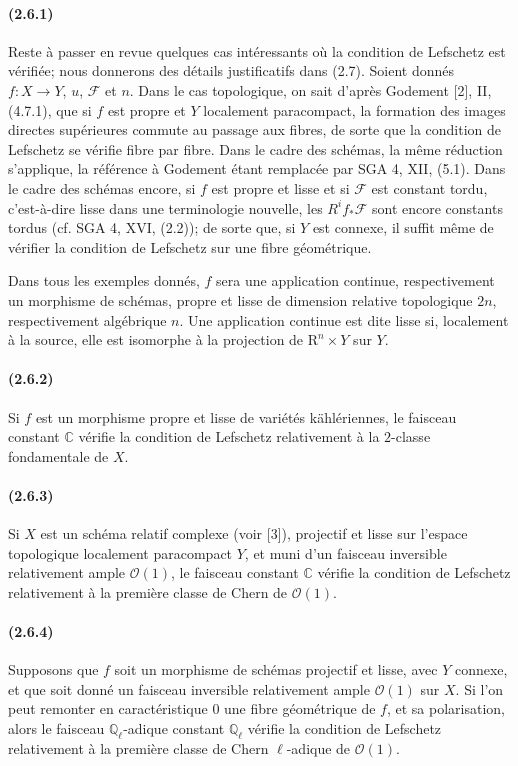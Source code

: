 \documentclass[10pt]{article}
\newcommand{\R}{\mathrm R}
\providecommand{\C}{\mathbb C}
\providecommand{\Ql}{\mathbb Q_\ell}
\begin{document}
\paragraph{(2.6.1)} Reste à passer en revue quelques cas intéressants où la condition de Lefschetz est vérifiée; nous donnerons des détails justificatifs dans (2.7). Soient donnés $f:X\to Y$, $u$, $\mathcal F$ et $n$. Dans le cas topologique, on sait d'après Godement [2], II, (4.7.1), que si $f$ est propre et $Y$ localement paracompact, la formation des images directes supérieures commute au passage aux fibres, de sorte que la condition de Lefschetz se vérifie fibre par fibre. Dans le cadre des schémas, la même réduction s'applique, la référence à Godement étant remplacée par SGA 4, XII, (5.1). Dans le cadre des schémas encore, si $f$ est propre et lisse et si $\mathcal F$ est constant tordu, c'est-à-dire lisse dans une terminologie nouvelle, les $R^if_*\mathcal F$ sont encore constants tordus (cf. SGA 4, XVI, (2.2)); de sorte que, si $Y$ est connexe, il suffit même de vérifier la condition de Lefschetz sur une fibre géométrique.

Dans tous les exemples donnés, $f$ sera une application continue, respectivement un morphisme de schémas, propre et lisse de dimension relative topologique $2n$, respectivement algébrique $n$. Une application continue est dite lisse si, localement à la source, elle est isomorphe à la projection de $\R^n\times Y$ sur $Y$.

\paragraph{(2.6.2)} Si $f$ est un morphisme propre et lisse de variétés kählériennes, le faisceau constant $\C$ vérifie la condition de Lefschetz relativement à la $2$-classe fondamentale de $X$.

\paragraph{(2.6.3)} Si $X$ est un schéma relatif complexe (voir [3]), projectif et lisse sur l'espace topologique localement paracompact $Y$, et muni d'un faisceau inversible relativement ample $\mathcal O(1)$, le faisceau constant $\C$ vérifie la condition de Lefschetz relativement à la première classe de Chern de $\mathcal O(1)$.

\paragraph{(2.6.4)} Supposons que $f$ soit un morphisme de schémas projectif et lisse, avec $Y$ connexe, et que soit donné un faisceau inversible relativement ample $\mathcal O(1)$ sur $X$. Si l'on peut remonter en caractéristique $0$ une fibre géométrique de $f$, et sa polarisation, alors le faisceau $\Ql$-adique constant $\Ql$ vérifie la condition de Lefschetz relativement à la première classe de Chern $\ell$-adique de $\mathcal O(1)$.
\end{document}

